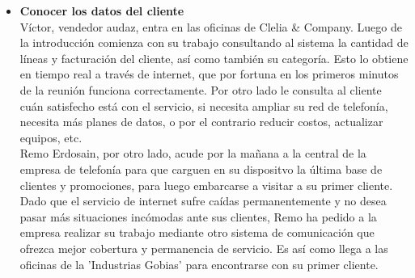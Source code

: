 \begin{itemize}
  \item \textbf{Conocer los datos del cliente} \\
    Víctor, vendedor audaz, entra en las oficinas de Clelia \& Company.
    Luego de la introducción comienza con su trabajo consultando al sistema
    la cantidad de líneas y facturación del cliente, así como también su categoría. Esto lo obtiene en tiempo real a través de internet, que por fortuna en los primeros minutos de la reunión funciona correctamente. Por otro lado le consulta al cliente cuán satisfecho está con el servicio, si necesita ampliar su red de telefonía, necesita más planes de datos, o por el contrario reducir costos, actualizar equipos, etc.\\
	Remo Erdosain, por otro lado, acude por la mañana a la central de la empresa de telefonía para que carguen en su dispositvo la última base de clientes y promociones, para luego embarcarse a visitar a su primer cliente. Dado que el servicio de internet sufre caídas permanentemente y no desea pasar más situaciones incómodas ante sus clientes, Remo ha pedido a la empresa realizar su trabajo mediante otro sistema de comunicación que ofrezca mejor cobertura y permanencia de servicio. Es así como llega a las oficinas de la 'Industrias Gobias' para encontrarse con su primer cliente.\\


\end{itemize}
